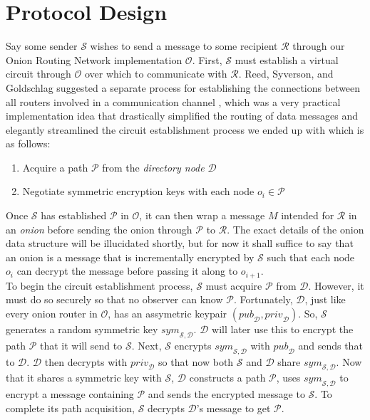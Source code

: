 \documentclass[10pt]{report}
\begin{document}
\section{Protocol Design}
Say some sender $\mathcal{S}$ wishes to send a message to some recipient $\mathcal{R}$
through our Onion Routing Network implementation $\mathcal{O}$.  First, $\mathcal{S}$
must establish a virtual circuit through $\mathcal{O}$ over which to communicate with
$\mathcal{R}$.  Reed, Syverson, and Goldschlag suggested a separate process for
establishing the connections between all routers involved in a communication channel
\cite{OnionRoutingPatent,HidingRoutingInformation}, which was a very practical implementation
idea that drastically simplified the routing of data messages and elegantly streamlined the
circuit establishment process we ended up with which is as follows:
\begin{enumerate}
    \item Acquire a path $\mathcal{P}$ from the \textit{directory node} $\mathcal{D}$
    \item Negotiate symmetric encryption keys with each node $o_i \in \mathcal{P}$
\end{enumerate}
Once $\mathcal{S}$ has established $\mathcal{P}$ in $\mathcal{O}$, it can then wrap a message $M$
intended for $\mathcal{R}$ in an \textit{onion} before sending the onion through $\mathcal{P}$ to
$\mathcal{R}$.  The exact details of the onion data structure will be illucidated shortly, but for
now it shall suffice to say that an onion is a message that is incrementally encrypted by $\mathcal{S}$
such that each node $o_i$ can decrypt the message before passing it along to $o_{i+1}$.\\

To begin the circuit establishment process, $\mathcal{S}$ must acquire $\mathcal{P}$ from
$\mathcal{D}$.  However, it must do so securely so that no observer can know $\mathcal{P}$.
Fortunately, $\mathcal{D}$, just like every onion router in $\mathcal{O}$, has an assymetric
keypair $(\mathit{pub}_\mathcal{D}, \mathit{priv}_\mathcal{D})$.  So, $\mathcal{S}$ generates a
random symmetric key $\mathit{sym}_{\mathcal{S},\mathcal{D}}$.  $\mathcal{D}$ will later use this to encrypt
the path $\mathcal{P}$ that it will send to $\mathcal{S}$.  Next, $\mathcal{S}$ encrypts
$\mathit{sym}_{\mathcal{S},\mathcal{D}}$ with $\mathit{pub}_\mathcal{D}$ and sends that to
$\mathcal{D}$.  $\mathcal{D}$ then decrypts with $\mathit{priv}_\mathcal{D}$ so that now both
$\mathcal{S}$ and $\mathcal{D}$ share $\mathit{sym}_{\mathcal{S},\mathcal{D}}$.  Now that it shares
a symmetric key with $\mathcal{S}$, $\mathcal{D}$ constructs a path $\mathcal{P}$, uses
$\mathit{sym}_{\mathcal{S},\mathcal{D}}$ to encrypt a message containing $\mathcal{P}$ and sends
the encrypted message to $\mathcal{S}$.  To complete its path acquisition, $\mathcal{S}$ decrypts
$\mathcal{D}$'s message to get $\mathcal{P}$.\\
\end{document}
